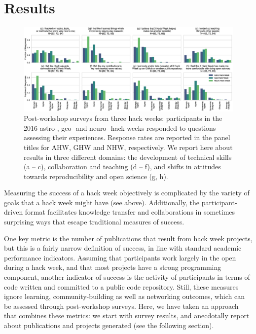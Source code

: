 \section*{Results}

\begin{figure}[h!]
\centering
\includegraphics[width=\textwidth]{f2.eps}
\caption{Post-workshop surveys from three hack weeks: participants in the 2016 astro-, geo- and neuro- hack weeks responded to questions assessing their experiences. Response rates are reported in the panel titles for AHW, GHW and NHW, respectively. We report here about results in three different domains: the development of technical skills (a -- c), collaboration and teaching (d -- f), and shifts in attitudes towards reproducibility and open science (g, h).}
\label{fig:survey}
\end{figure}

Measuring the success of a hack week objectively is complicated by the variety of goals that a hack week might have (see above). 
Additionally, the participant-driven format facilitates knowledge transfer and collaborations in sometimes surprising ways that escape traditional measures of success.

One key metric is the number of publications that result from hack week projects, but this is a fairly narrow definition of success, in line with standard academic performance indicators.
Assuming that participants work largely in the open during a hack week, and that most projects have a strong programming component, another indicator of success is the activity of participants in terms of code written and committed to a public code repository.
Still, these measures ignore learning, community-building as well as networking outcomes, which can be assessed through post-workshop surveys.
Here, we have taken an approach that combines these metrics: we start with survey results, and anecdotally report about publications and projects generated (see the following section).

